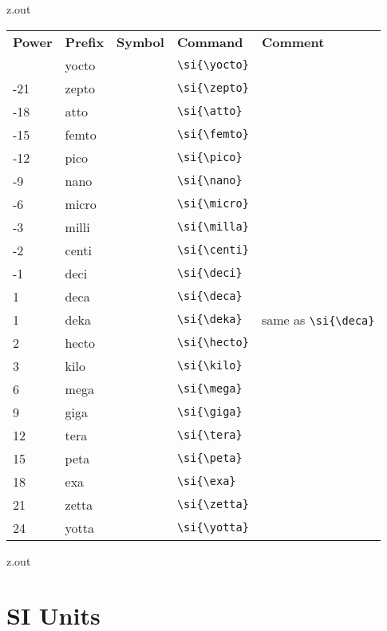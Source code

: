 \MyIO

\begin{VerbatimOut}{z.out}

\begin{tabular}{@{}mllll@{}}
  \multicolumn{1}{l}{\bfseries Power}&
    \bfseries Prefix&
    \bfseries Symbol&
    \bfseries Command&
    \bfseries Comment\\
  \tabularspace
  -24& yocto& \si{\yocto}& \verb+\si{\yocto}+\\
  -21& zepto& \si{\zepto}& \verb+\si{\zepto}+\\
  -18& atto&  \si{\atto}&  \verb+\si{\atto}+\\
  -15& femto& \si{\femto}& \verb+\si{\femto}+\\
  -12& pico&  \si{\pico}&  \verb+\si{\pico}+\\
   -9& nano&  \si{\nano}&  \verb+\si{\nano}+\\
   -6& micro& \si{\micro}& \verb+\si{\micro}+\\
   -3& milli& \si{\milli}& \verb+\si{\milla}+\\
   -2& centi& \si{\centi}& \verb+\si{\centi}+\\
   -1& deci&  \si{\deci}&  \verb+\si{\deci}+\\
    1& deca&  \si{\deca}&  \verb+\si{\deca}+\\
    1& deka&  \si{\deka}&  \verb+\si{\deka}+& same as \verb+\si{\deca}+\\
    2& hecto& \si{\hecto}& \verb+\si{\hecto}+\\
    3& kilo&  \si{\kilo}&  \verb+\si{\kilo}+\\
    6& mega&  \si{\mega}&  \verb+\si{\mega}+\\
    9& giga&  \si{\giga}&  \verb+\si{\giga}+\\
   12& tera&  \si{\tera}&  \verb+\si{\tera}+\\
   15& peta&  \si{\peta}&  \verb+\si{\peta}+\\
   18& exa&   \si{\exa}&   \verb+\si{\exa}+\\
   21& zetta& \si{\zetta}& \verb+\si{\zetta}+\\
   24& yotta& \si{\yotta}& \verb+\si{\yotta}+\\
\end{tabular}
\end{VerbatimOut}

\MyIO


\begin{VerbatimOut}{z.out}

\section{SI Units}
\end{VerbatimOut}

